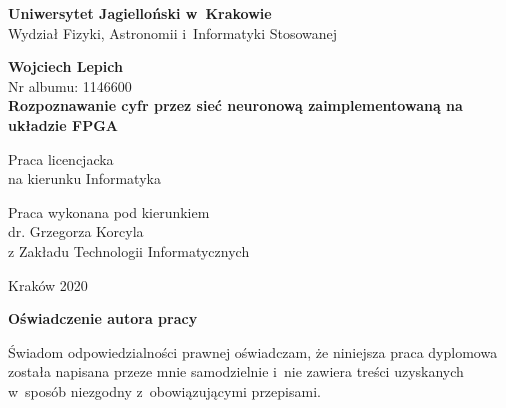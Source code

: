 \documentclass[12pt, oneside, a4paper]{article}
\begin{document}
\thispagestyle{empty}
\begin{titlepage}
    \begin{center}

      \Large
	    \textbf{Uniwersytet Jagielloński w~Krakowie}\vspace{0.2cm}\\ Wydział Fizyki, Astronomii i~Informatyki Stosowanej
      \vspace*{1cm}
               
      \vspace{3cm}
      \Large
      \textbf{Wojciech Lepich}\\\vspace{0.5cm}
      \normalsize Nr albumu: 1146600\\
      \vspace{2cm}
      \Huge
      \textbf{Rozpoznawanie cyfr przez sieć neuronową zaimplementowaną na układzie FPGA}
      
      \vspace{1.5cm}
      \normalsize
      Praca licencjacka\\
      na kierunku Informatyka\\ \vspace{0.15cm}
        
      \vfill
      \vspace{2cm}
      \begin{minipage}{1\textwidth}
\begin{flushright}
Praca wykonana pod kierunkiem\\
dr. Grzegorza Korcyla\\
z Zakładu Technologii Informatycznych
\end{flushright}
\end{minipage}
        
        \vspace{2cm}
        \begin{center}
      Kraków 2020
        \end{center}
    \end{center}
\end{titlepage}

\newpage 
\thispagestyle{empty}
\vspace{2.5cm}
\begin{flushleft}
\large \textbf{Oświadczenie autora pracy}\vspace{0.6cm}\\
\end{flushleft}

\noindent Świadom odpowiedzialności prawnej oświadczam, że niniejsza praca dyplomowa została napisana przeze mnie samodzielnie i~nie zawiera treści uzyskanych w~sposób niezgodny z~obowiązującymi przepisami.\\
\end{document}
